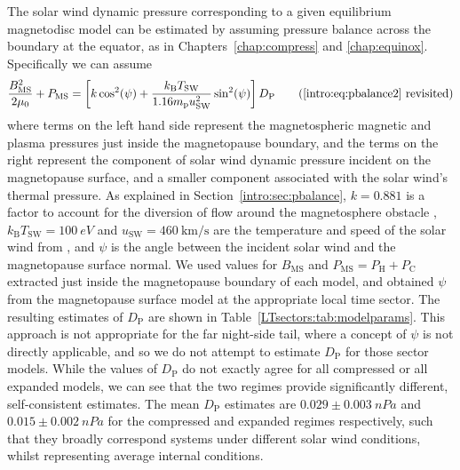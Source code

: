 The solar wind dynamic pressure corresponding to a given equilibrium magnetodisc model can be estimated by assuming pressure balance across the boundary at the equator, as in Chapters~\ref{chap:compress} and \ref{chap:equinox}. Specifically we can assume
\begin{equation}\label{LTsectors:eq:pbalance}
\frac{B_\mathrm{MS}^2}{2\mu_0} + P_\mathrm{MS} = \left[k\cos^2(\psi) + \frac{k_\mathrm{B}T_\mathrm{SW}}{1.16m_\mathrm{p}u_\mathrm{SW}^2}\sin^2(\psi)\right] D_\mathrm{P} \tag{\ref{intro:eq:pbalance2} revisited}
\end{equation}
where terms on the left hand side represent the magnetospheric  magnetic and plasma pressures just inside the magnetopause boundary, and the terms on the right  represent the component of solar wind dynamic pressure incident on the magnetopause surface, and a smaller component associated with the solar wind's thermal pressure. As explained in Section~\ref{intro:sec:pbalance}, $k = 0.881$ is a factor to account for the diversion of flow around the magnetosphere obstacle \citep[see][]{spreiter1966}, $k_\mathrm{B}T_\mathrm{SW} = \SI{100}{eV}$  and $u_\mathrm{SW} = \SI{460}{\km\per\second}$ are the temperature and speed of the solar wind from \citet{pilkington2015}, and $\psi$ is the angle between the incident solar wind and the magnetopause surface normal. We used values for $B_\mathrm{MS}$ and $P_\mathrm{MS} = P_\mathrm{H} + P_\mathrm{C}$ extracted just inside the magnetopause boundary of each model, and obtained $\psi$ from the \citet{pilkington2015b} magnetopause surface model at the appropriate local time sector. The resulting estimates of $D_\mathrm{P}$ are shown in Table~\ref{LTsectors:tab:modelparams}. This approach is not appropriate for the far night-side tail, where a concept of $\psi$ is not directly applicable, and so we do not attempt to estimate $D_\mathrm{P}$ for those sector models. While the values of $D_\mathrm{P}$ do not exactly agree for all compressed or all expanded models, we can see that the two regimes provide significantly different, self-consistent estimates. The mean $D_\mathrm{P}$ estimates are $0.029\pm\SI{0.003}{nPa}$ and $0.015\pm\SI{0.002}{nPa}$ for the compressed and expanded regimes respectively, such that they broadly correspond systems under different solar wind conditions, whilst representing average internal conditions.

